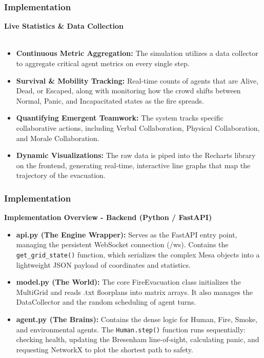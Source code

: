 \documentclass{beamer}
\begin{document}
\begin{frame}
\frametitle{Implementation}
\textbf{Live Statistics \& Data Collection} \\
\vspace{0.2cm}
\footnotesize 

\begin{itemize}
    \item \textbf{Continuous Metric Aggregation:} The simulation utilizes a data collector to aggregate critical agent metrics on every single step.
    \item \textbf{Survival \& Mobility Tracking:} Real-time counts of agents that are Alive, Dead, or Escaped, along with monitoring how the crowd shifts between Normal, Panic, and Incapacitated states as the fire spreads.
    \item \textbf{Quantifying Emergent Teamwork:} The system tracks specific collaborative actions, including Verbal Collaboration, Physical Collaboration, and Morale Collaboration.
    \item \textbf{Dynamic Visualizations:} The raw data is piped into the Recharts library on the frontend, generating real-time, interactive line graphs that map the trajectory of the evacuation.
\end{itemize}
\end{frame}


\begin{frame}
\frametitle{Implementation}
\textbf{Implementation Overview - Backend (Python / FastAPI)}
\footnotesize 

\begin{itemize}
    \item \textbf{api.py (The Engine Wrapper):} Serves as the FastAPI entry point, managing the persistent WebSocket connection (/ws). Contains the \texttt{get\_grid\_state()} function, which serializes the complex Mesa objects into a lightweight JSON payload of coordinates and statistics.
    \item \textbf{model.py (The World):} The core FireEvacuation class initializes the MultiGrid and reads .txt floorplans into matrix arrays. It also manages the DataCollector and the random scheduling of agent turns.
    \item \textbf{agent.py (The Brains):} Contains the dense logic for Human, Fire, Smoke, and environmental agents. The \texttt{Human.step()} function runs sequentially: checking health, updating the Bresenham line-of-sight, calculating panic, and requesting NetworkX to plot the shortest path to safety.
\end{itemize}
\end{frame}
\end{document}
